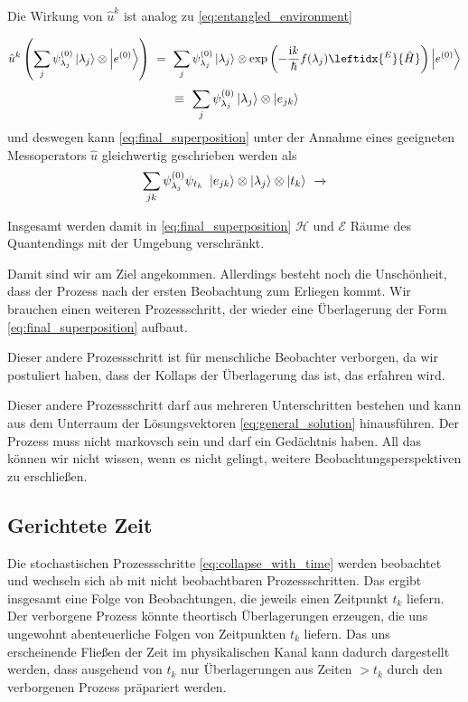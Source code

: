 \documentclass[12pt]{article}
\begin{document}
Die Wirkung von $\hat{u}^k$ ist analog zu \eqref{eq:entangled_environment}

\begin{equation*}
\hat{u}^k\left(\sum_j \psi^{(0)}_{\lambda_j} \ket{\lambda_j}\otimes\ket{e^{(0)}}\right)
\ =\ \sum_j \psi^{(0)}_{\lambda_j} \ket{\lambda_j} 
\otimes \mathrm{exp}\left(-\frac{\mathrm{i}k}{\hbar}f(\lambda_j)\leftidx{^E}{\hat{H}}\right)
\ket{e^{(0)}} 
\end{equation*}
\begin{equation}
\label{eq:entangled_environment_new}
\ \equiv\ 
\sum_j \psi^{(0)}_{\lambda_j} \ket{\lambda_j} 
\otimes \ket{e_{jk}} 
\end{equation}
und deswegen kann \eqref{eq:final_superposition} unter der Annahme eines geeigneten Messoperators $\hat{u}$ gleichwertig geschrieben werden als
\begin{equation}
\label{eq:final_superposition_2}
\sum_{jk} \psi_{\lambda_j}^{(0)}\psi_{t_k}\ \ket{e_{jk}} \otimes \ket{\lambda_j} \otimes \ket{t_k}
\ \xrightarrow{}
\end{equation}

Insgesamt werden damit in \eqref{eq:final_superposition} $\mathscr{H}$ und $\mathscr{E}$ Räume des Quantendings mit der Umgebung verschränkt.

Damit sind wir am Ziel angekommen. Allerdings besteht noch die Unschönheit, dass der Prozess nach der ersten Beobachtung zum Erliegen kommt. Wir brauchen einen weiteren Prozessschritt, der wieder eine Überlagerung der Form \eqref{eq:final_superposition} aufbaut. 

Dieser andere Prozessschritt ist für menschliche Beobachter verborgen, da wir postuliert haben, dass der Kollaps der Überlagerung das ist, das erfahren wird. 

Dieser andere Prozessschritt darf aus mehreren Unterschritten bestehen und kann aus dem Unterraum der Lösungsvektoren \eqref{eq:general_solution} hinausführen. Der Prozess muss nicht markovsch sein und darf ein Gedächtnis haben. All das können wir nicht wissen, wenn es nicht gelingt, weitere Beobachtungsperspektiven zu erschließen. 

\subsection{Gerichtete Zeit}

Die stochastischen Prozessschritte \eqref{eq:collapse_with_time} werden beobachtet und wechseln sich ab mit nicht beobachtbaren Prozessschritten. Das ergibt insgesamt eine Folge von Beobachtungen, die jeweils einen Zeitpunkt $t_k$ liefern. Der verborgene Prozess könnte theortisch Überlagerungen erzeugen, die uns ungewohnt abenteuerliche Folgen von Zeitpunkten $t_k$ liefern. Das uns erscheinende Fließen der Zeit im physikalischen Kanal kann dadurch dargestellt werden, dass ausgehend von $t_k$ nur Überlagerungen aus Zeiten $> t_k$ durch den verborgenen Prozess präpariert werden.
\end{document}

